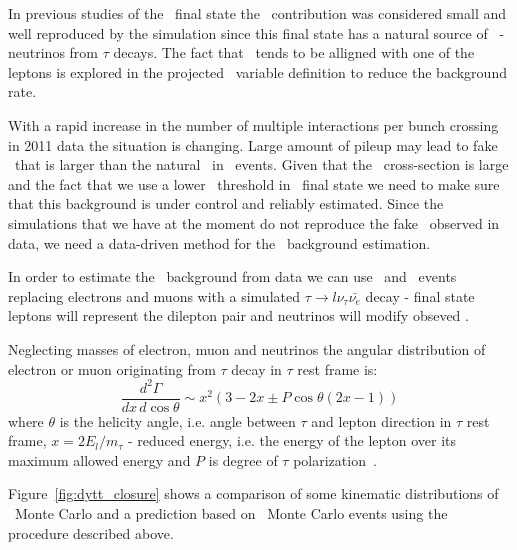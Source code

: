 In previous studies of the \WW\ final state the \dytt\ contribution
was considered small and well reproduced by the simulation since this
final state has a natural source of \met\ - neutrinos from $\tau$
decays. The fact that \met\ tends to be alligned with one of the
leptons is explored in the projected \met\ variable definition to
reduce the background rate.

With a rapid increase in the number of multiple interactions per bunch
crossing in 2011 data the situation is changing. Large amount of
pileup may lead to fake \met\ that is larger than the natural \met\
in \dytt\ events. Given that the \dytt\ cross-section is large and the
fact that we use a lower \met\ threshold in \emu\ final state we need
to make sure that this background is under control and reliably
estimated. Since the simulations that we have at the moment do not
reproduce the fake \met\ observed in data, we need a data-driven
method for the \dytt\ background estimation.

In order to estimate the \dytt\ background from data we can use \zee\
and \zmm\ events replacing electrons and muons with a simulated
$\tau\to l\nu_\tau\bar{\nu_e}$ decay - final state leptons will
represent the dilepton pair and neutrinos will modify obseved \met{}.

Neglecting masses of electron, muon and neutrinos the angular
distribution of electron or muon originating from $\tau$ decay in
$\tau$ rest frame is:
\begin{equation}
        \frac{d^2\Gamma}{dx\,d\cos\theta}\sim x^2(3-2x \pm P\cos\theta(2x-1))
\end{equation}
where $\theta$ is the helicity angle, i.e. angle between $\tau$ and
lepton direction in $\tau$ rest frame, $x=2E_l/m_\tau$ - reduced
energy, i.e. the energy of the lepton over its maximum allowed energy
and $P$ is degree of $\tau$ polarization~\cite{pdg}.

Figure~\ref{fig:dytt_closure} shows a comparison of some kinematic
distributions of \dytt\ Monte Carlo and a prediction based on \dymm\
Monte Carlo events using the procedure described above.



